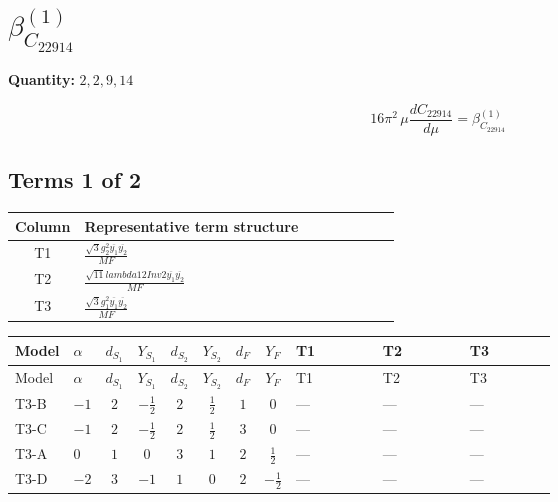 \documentclass[8pt]{article}
\begin{document}
\begin{landscape}
\begin{longtable}{@{}llcccccc >{\raggedright\arraybackslash}p{0.21\linewidth} >{\raggedright\arraybackslash}p{0.21\linewidth} >{\raggedright\arraybackslash}p{0.21\linewidth}@{}}
\midrule
\bottomrule
\end{longtable}
\clearpage
\section*{$\beta_{C_{22914}}^{(1)}$}
\noindent\textbf{Quantity: }$\mathrm{2,2,9,14}$\par\smallskip
\[16\pi^2\,\mu\frac{d C_{22914}}{d\mu}=\beta_{C_{22914}}^{(1)}\]
\subsection*{Terms 1 of 2}
\begin{center}
\begin{tabular}{@{}c >{\raggedright\arraybackslash}p{0.82\linewidth}@{}}
\toprule
Column & Representative term structure \\
\midrule
T1 & \(\displaystyle \frac{\sqrt{3} g_{2}^{2} \overline{y_{1}} \overline{y_{2}}}{MF}\) \\
\midrule
T2 & \(\displaystyle \frac{\sqrt{11} lambda12Inv2 \overline{y_{1}} \overline{y_{2}}}{MF}\) \\
\midrule
T3 & \(\displaystyle \frac{\sqrt{3} g_{1}^{2} \overline{y_{1}} \overline{y_{2}}}{MF}\) \\
\midrule
\bottomrule
\end{tabular}
\end{center}
\smallskip
\tiny
\begin{longtable}{@{}llcccccc >{\raggedright\arraybackslash}p{0.21\linewidth} >{\raggedright\arraybackslash}p{0.21\linewidth} >{\raggedright\arraybackslash}p{0.21\linewidth}@{}}
\toprule
Model & $\alpha$ & $d_{S_1}$ & $Y_{S_1}$ & $d_{S_2}$ & $Y_{S_2}$ & $d_F$ & $Y_F$ & T1 & T2 & T3 \\
\midrule
\endfirsthead
\toprule
Model & $\alpha$ & $d_{S_1}$ & $Y_{S_1}$ & $d_{S_2}$ & $Y_{S_2}$ & $d_F$ & $Y_F$ & T1 & T2 & T3 \\
\midrule
\endhead
T3-B & $-1$ & $2$ & $-\frac{1}{2}$ & $2$ & $\frac{1}{2}$ & $1$ & $0$ & --- & --- & --- \\
\midrule
T3-C & $-1$ & $2$ & $-\frac{1}{2}$ & $2$ & $\frac{1}{2}$ & $3$ & $0$ & --- & --- & --- \\
\midrule
T3-A & $0$ & $1$ & $0$ & $3$ & $1$ & $2$ & $\frac{1}{2}$ & --- & --- & --- \\
\midrule
T3-D & $-2$ & $3$ & $-1$ & $1$ & $0$ & $2$ & $-\frac{1}{2}$ & --- & --- & --- \\
\midrule

\end{longtable}
\end{landscape}
\end{document}
